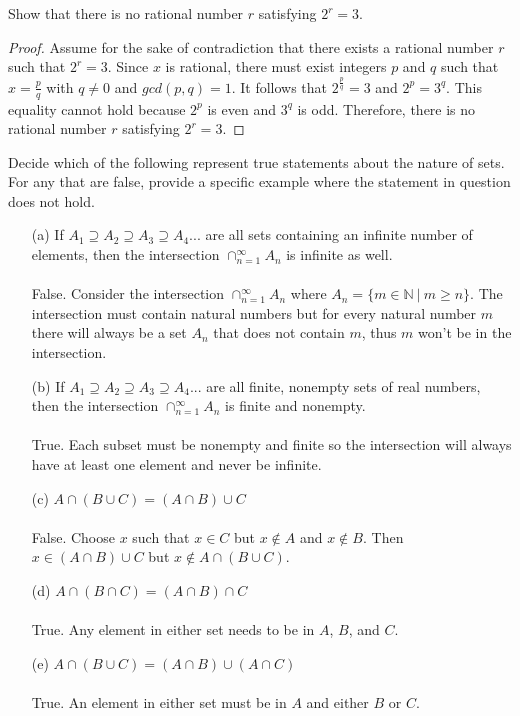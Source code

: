 \documentclass[11pt]{article}
\def\N{{\mathbb{N}}}
\newenvironment{exer}[1]
    {\renewcommand\theinnercustomexer{#1}\innercustomexer\upshape}
    {\endinnercustomexer}
\begin{document}
\begin{exer}{1.2.2}
    Show that there is no rational number $r$ satisfying $2^r=3$.
    \begin{proof}
        Assume for the sake of contradiction that there exists a rational number $r$ such that $2^r=3$. Since $x$ is rational, there must exist integers $p$ and $q$ such that $x=\frac{p}{q}$ with $q\neq 0$ and $gcd(p,q)=1$. It follows that $2^{\frac{p}{q}}=3$ and $2^p=3^q$. This equality cannot hold because $2^p$ is even and $3^q$ is odd. Therefore, there is no rational number $r$ satisfying $2^r=3$.
    \end{proof}
\end{exer}
\begin{exer}{1.2.3}
    Decide which of the following represent true statements about the nature of sets. For any that are false, provide a specific example where the statement in question does not hold.
    \begin{enumerate}
        \item[(a)] 
            If $A_1\supseteq A_2\supseteq A_3\supseteq A_4...$ are all sets containing an infinite number of elements, then the intersection $\cap_{n=1}^{\infty} A_n$ is infinite as well. \\ \\
            False. Consider the intersection $\cap_{n=1}^{\infty} A_n$ where $A_n=\{m\in\N~|~m\geq n\}$. The intersection must contain natural numbers but for every natural number $m$ there will always be a set $A_n$ that does not contain $m$, thus $m$ won't be in the intersection.
        \item[(b)] 
            If $A_1\supseteq A_2\supseteq A_3\supseteq A_4...$ are all finite, nonempty sets of real numbers, then the intersection $\cap_{n=1}^{\infty}A_n$ is finite and nonempty. \\ \\
            True. Each subset must be nonempty and finite so the intersection will always have at least one element and never be infinite.
        \item[(c)]
            $A\cap(B\cup C)=(A\cap B)\cup C$ \\ \\
            False. Choose $x$ such that $x\in C$ but $x\notin A$ and $x\notin B$. Then $x\in (A\cap B)\cup C$ but $x\notin A\cap(B\cup C)$.
        \item[(d)]
            $A\cap(B\cap C)=(A\cap B)\cap C$ \\ \\
            True. Any element in either set needs to be in $A$, $B$, and $C$.
        \item[(e)]
            $A\cap(B\cup C)=(A\cap B)\cup(A\cap C)$ \\ \\
            True. An element in either set must be in $A$ and either $B$ or $C$.
    \end{enumerate}
\end{exer}
\end{document}
